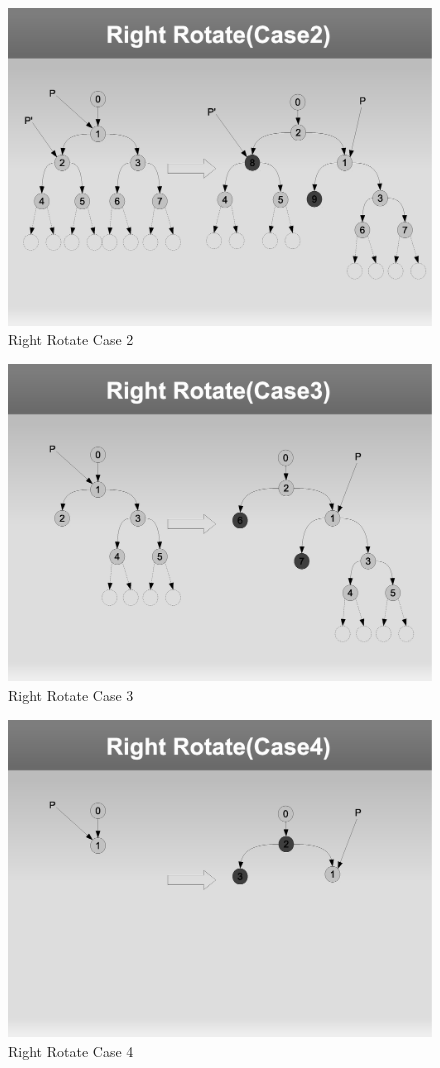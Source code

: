 \documentclass[a4paper]{article}
\begin{document}
\begin{figure}
    \centering
    \includegraphics[scale=0.5]{right_rotate_2.eps}
    \caption{Right Rotate Case 2}
\end{figure}

\begin{figure}
    \centering
    \includegraphics[scale=0.5]{right_rotate_3.eps}
    \caption{Right Rotate Case 3}
\end{figure}

\begin{figure}
    \centering
    \includegraphics[scale=0.5]{right_rotate_4.eps}
    \caption{Right Rotate Case 4}
\end{figure}
\end{document}
